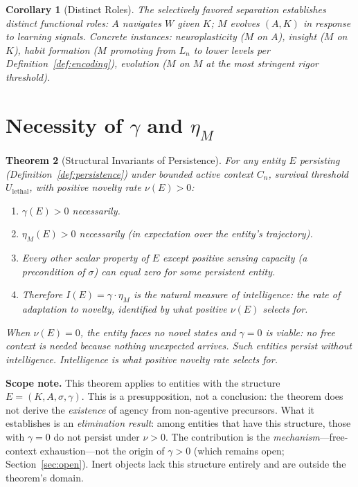 \documentclass[11pt]{article}
\newtheorem{theorem}{Theorem}
\newtheorem{corollary}[theorem]{Corollary}
\theoremstyle{definition}
\theoremstyle{remark}
\begin{document}
\begin{corollary}[Distinct Roles]
\label{cor:roles}
The selectively favored separation establishes distinct functional roles:
$A$ navigates $W$ given $K$; $M$ evolves $(A, K)$ in response to
learning signals. Concrete instances: neuroplasticity ($M$ on $A$),
insight ($M$ on $K$), habit formation ($M$ promoting from $L_n$ to
lower levels per Definition~\ref{def:encoding}), evolution ($M$ on $M$
at the most stringent rigor threshold).
\end{corollary}

\section{Necessity of $\gamma$ and $\eta_M$}
\label{sec:necessity}

\begin{theorem}[Structural Invariants of Persistence]
\label{thm:invariants}
For any entity $E$ persisting (Definition~\ref{def:persistence}) under
bounded active context $C_n$, survival threshold
$U_{\mathrm{lethal}}$, with positive novelty rate $\nu(E) > 0$:
\begin{enumerate}
\item[(i)] $\gamma(E) > 0$ necessarily.
\item[(ii)] $\eta_M(E) > 0$ necessarily (in expectation over the
      entity's trajectory).
\item[(iii)] Every other scalar property of $E$ except positive
      sensing capacity (a precondition of $\sigma$) can equal zero
      for some persistent entity.
\item[(iv)] Therefore $I(E) = \gamma \cdot \eta_M$ is the natural measure
      of intelligence: the rate of adaptation to novelty, identified
      by what positive $\nu(E)$ selects for.
\end{enumerate}

When $\nu(E) = 0$, the entity faces no novel states and $\gamma = 0$ is
viable: no free context is needed because nothing unexpected arrives.
Such entities persist without intelligence. Intelligence is what positive
novelty rate selects for.
\end{theorem}

\textbf{Scope note.} This theorem applies to entities with the
structure $E = (K, A, \sigma, \gamma)$. This is a presupposition, not a
conclusion: the theorem does not derive the \emph{existence} of agency
from non-agentive precursors. What it establishes is an
\emph{elimination result}: among entities that have this structure,
those with $\gamma = 0$ do not persist under $\nu > 0$. The
contribution is the \emph{mechanism}---free-context exhaustion---not
the origin of $\gamma > 0$ (which remains open;
Section~\ref{sec:open}). Inert objects lack this structure entirely
and are outside the theorem's domain.
\end{document}
